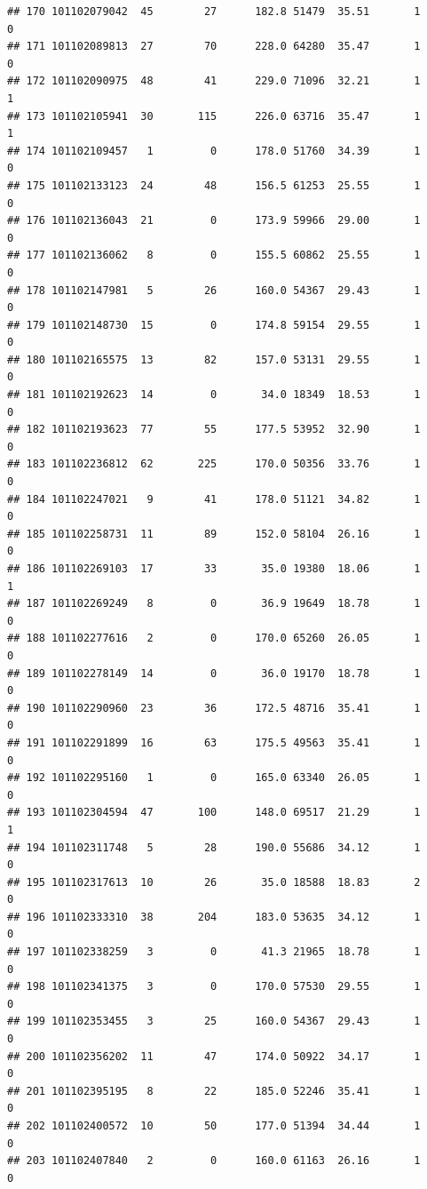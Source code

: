 \documentclass[
]{article}
\begin{document}
\begin{verbatim}
## 170 101102079042  45        27      182.8 51479  35.51       1          0
## 171 101102089813  27        70      228.0 64280  35.47       1          0
## 172 101102090975  48        41      229.0 71096  32.21       1          1
## 173 101102105941  30       115      226.0 63716  35.47       1          1
## 174 101102109457   1         0      178.0 51760  34.39       1          0
## 175 101102133123  24        48      156.5 61253  25.55       1          0
## 176 101102136043  21         0      173.9 59966  29.00       1          0
## 177 101102136062   8         0      155.5 60862  25.55       1          0
## 178 101102147981   5        26      160.0 54367  29.43       1          0
## 179 101102148730  15         0      174.8 59154  29.55       1          0
## 180 101102165575  13        82      157.0 53131  29.55       1          0
## 181 101102192623  14         0       34.0 18349  18.53       1          0
## 182 101102193623  77        55      177.5 53952  32.90       1          0
## 183 101102236812  62       225      170.0 50356  33.76       1          0
## 184 101102247021   9        41      178.0 51121  34.82       1          0
## 185 101102258731  11        89      152.0 58104  26.16       1          0
## 186 101102269103  17        33       35.0 19380  18.06       1          1
## 187 101102269249   8         0       36.9 19649  18.78       1          0
## 188 101102277616   2         0      170.0 65260  26.05       1          0
## 189 101102278149  14         0       36.0 19170  18.78       1          0
## 190 101102290960  23        36      172.5 48716  35.41       1          0
## 191 101102291899  16        63      175.5 49563  35.41       1          0
## 192 101102295160   1         0      165.0 63340  26.05       1          0
## 193 101102304594  47       100      148.0 69517  21.29       1          1
## 194 101102311748   5        28      190.0 55686  34.12       1          0
## 195 101102317613  10        26       35.0 18588  18.83       2          0
## 196 101102333310  38       204      183.0 53635  34.12       1          0
## 197 101102338259   3         0       41.3 21965  18.78       1          0
## 198 101102341375   3         0      170.0 57530  29.55       1          0
## 199 101102353455   3        25      160.0 54367  29.43       1          0
## 200 101102356202  11        47      174.0 50922  34.17       1          0
## 201 101102395195   8        22      185.0 52246  35.41       1          0
## 202 101102400572  10        50      177.0 51394  34.44       1          0
## 203 101102407840   2         0      160.0 61163  26.16       1          0

\end{verbatim}
\end{document}
